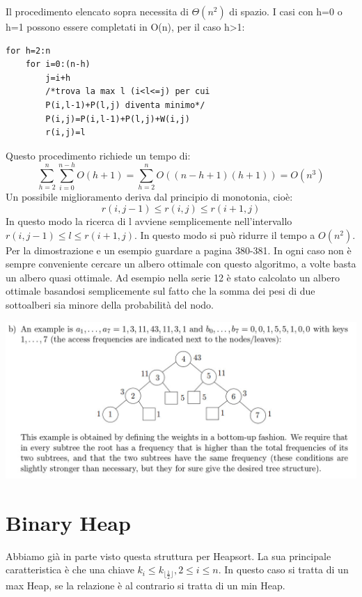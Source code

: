 \documentclass[a4paper]{book}
\begin{document}
Il procedimento elencato sopra necessita di $\Theta (n^2)$ di spazio. I casi con h=0 o h=1 possono essere completati in O(n), per il caso h>1:
\begin{lstlisting}
for h=2:n
	for i=0:(n-h)
		j=i+h
		/*trova la max l (i<l<=j) per cui
		P(i,l-1)+P(l,j) diventa minimo*/
		P(i,j)=P(i,l-1)+P(l,j)+W(i,j)
		r(i,j)=l		
\end{lstlisting}
Questo procedimento richiede un tempo di:
$$\sum_{h=2}^n \sum_{i=0}^{n-h} O(h+1)=\sum_{h=2}^n O((n-h+1)(h+1))= O(n^3)$$
Un possibile miglioramento deriva dal principio di monotonia, cioè:
$$r(i,j-1)\leq r(i,j) \leq r(i+1,j)$$
In questo modo la ricerca di l avviene semplicemente nell'intervallo $r(i,j-1)\leq l \leq r(i+1,j)$. In questo modo si può ridurre il tempo a $O(n^2)$. Per la dimostrazione e un esempio guardare a pagina 380-381.
In ogni caso non è sempre conveniente cercare un albero ottimale con questo algoritmo, a volte basta un albero quasi ottimale. Ad esempio nella serie 12 è stato calcolato un albero ottimale basandosi semplicemente sul fatto che la somma dei pesi di due sottoalberi sia minore della probabilità del nodo.
\begin{center}
\includegraphics[scale=0.3]{Figures/optimaltree.jpg}
\end{center} 
\section{Binary Heap}
Abbiamo già in parte visto questa struttura per Heapsort. La sua principale caratteristica è che una chiave $k_i \leq k_{\lfloor\frac{1}{2} \rfloor}, 2\leq i\leq n$. In questo caso si tratta di un max Heap, se la relazione è al contrario si tratta di un min Heap. 
\end{document}

